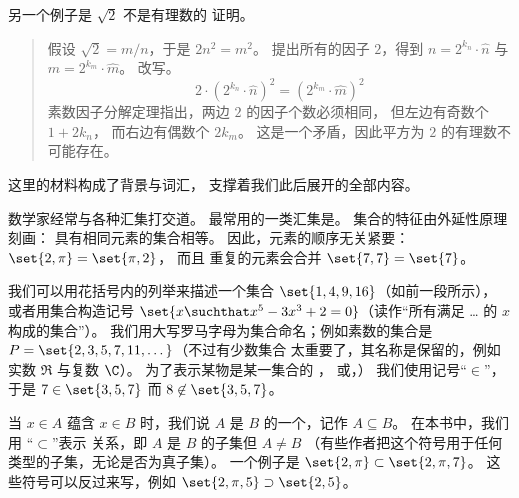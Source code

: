 另一个例子是 \( \sqrt{2} \) 不是有理数的
证明。
\begin{quote}\small
假设 \( \sqrt{2}=m/n \)，于是 $2n^2=m^2$。
提出所有的因子 \( 2 \)，得到
\( n=2^{k_n}\cdot \hat{n} \)
与
\( m=2^{k_m}\cdot \hat{m} \)。
改写。
\begin{equation*}
  2\cdot (2^{k_n}\cdot \hat{n})^2
  =
  (2^{k_m}\cdot \hat{m})^2
\end{equation*}
素数因子分解定理指出，两边 \( 2 \) 的因子个数必须相同，
但左边有奇数个 \( 1+2k_n \)，
而右边有偶数个 \( 2k_m \)。
这是一个矛盾，因此平方为
\( 2 \) 的有理数不可能存在。
\end{quote}















这里的材料构成了背景与词汇，
支撑着我们此后展开的全部内容。

数学家经常与各种汇集打交道。
最常用的一类汇集是。 
集合的特征由外延性原理刻画：
具有相同元素的集合相等。
因此，元素的顺序无关紧要：
\( \set{2,\pi}=\set{\pi,2} \)，
而且
重复的元素会合并 \( \set{7,7}=\set{7} \)。

我们可以用花括号内的列举来描述一个集合
\( \set{ 1,4,9,16 } \)（如前一段所示），
或者用集合构造记号
\( \set{x\suchthat x^5-3x^3+2=0 } \)（读作“所有满足 \ldots{}
的 \( x \) 构成的集合”）。
我们用大写罗马字母为集合命名；例如素数的集合是
\( P=\set{2,3,5,7,11,\ldots\,} \)（不过有少数集合
太重要了，其名称是保留的，例如
实数 \( \Re \)
与复数 \( \C \)）。
为了表示某物是某一集合的
， 
或，）
我们使用记号“\(\in \)”，
于是 \( 7\in\set{3,5,7} \) 而 \( 8\not\in\set{3,5,7} \)。

当 $x\in A$ 蕴含 $x\in B$ 时，我们说 \( A \) 是 \( B \) 的一个，记作
$A\subseteq B$。
在本书中，我们用
“\( \subset \)”表示 %
关系，即 \( A \) 是 \( B \) 的子集但 \( A\neq B \)
（有些作者把这个符号用于任何类型的子集，无论是否为真子集）。
一个例子是
\( \set{2,\pi}\subset\set{2,\pi,7} \)。
这些符号可以反过来写，例如
\( \set{ 2,\pi,5}\supset\set{2,5} \)。


